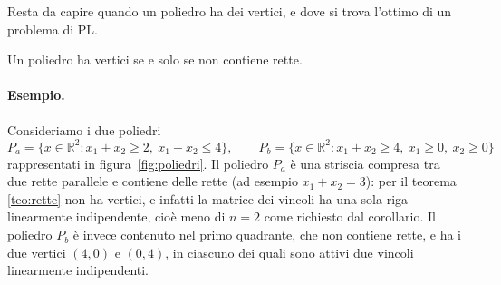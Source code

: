 Resta da capire quando un poliedro ha dei vertici, e dove si trova l'ottimo di un problema di PL.

\begin{teorema}\label{teo:rette}
Un poliedro ha vertici se e solo se non contiene rette.
\end{teorema}

\paragraph{Esempio.}
Consideriamo i due poliedri
\[
P_a = \{x \in \mathbb{R}^2 : x_1 + x_2 \ge 2,\ x_1 + x_2 \le 4\}, \qquad
P_b = \{x \in \mathbb{R}^2 : x_1 + x_2 \ge 4,\ x_1 \ge 0,\ x_2 \ge 0\}
\]
rappresentati in figura~\ref{fig:poliedri}. Il poliedro $P_a$ è una striscia compresa tra due rette parallele e contiene delle rette (ad esempio $x_1 + x_2 = 3$): per il teorema \ref{teo:rette} non ha vertici, e infatti la matrice dei vincoli ha una sola riga linearmente indipendente, cioè meno di $n = 2$ come richiesto dal corollario. Il poliedro $P_b$ è invece contenuto nel primo quadrante, che non contiene rette, e ha i due vertici $(4, 0)$ e $(0, 4)$, in ciascuno dei quali sono attivi due vincoli linearmente indipendenti.

